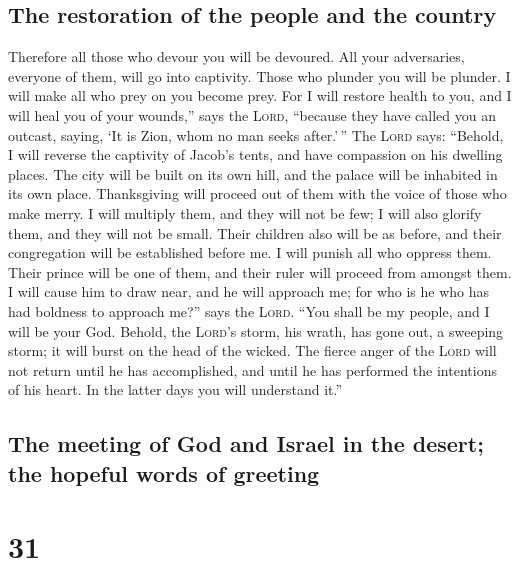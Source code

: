 \hypertarget{the-restoration-of-the-people-and-the-country}{%
\subsection{The restoration of the people and the
country}\label{the-restoration-of-the-people-and-the-country}}

 Therefore all those who devour you will be devoured. All
your adversaries, everyone of them, will go into captivity. Those who
plunder you will be plunder. I will make all who prey on you become
prey.  For I will restore health to you, and I will heal
you of your wounds,'' says the \textsc{Lord}, ``because they have called
you an outcast, saying, `It is Zion, whom no man seeks after.'\,''
 The \textsc{Lord} says: ``Behold, I will reverse the
captivity of Jacob's tents, and have compassion on his dwelling places.
The city will be built on its own hill, and the palace will be inhabited
in its own place.  Thanksgiving will proceed out of them
with the voice of those who make merry. I will multiply them, and they
will not be few; I will also glorify them, and they will not be small.
 Their children also will be as before, and their
congregation will be established before me. I will punish all who
oppress them.  Their prince will be one of them, and
their ruler will proceed from amongst them. I will cause him to draw
near, and he will approach me; for who is he who has had boldness to
approach me?'' says the \textsc{Lord}.  ``You shall be my
people, and I will be your God.  Behold, the
\textsc{Lord}'s storm, his wrath, has gone out, a sweeping storm; it
will burst on the head of the wicked.  The fierce anger
of the \textsc{Lord} will not return until he has accomplished, and
until he has performed the intentions of his heart. In the latter days
you will understand it.''

\hypertarget{the-meeting-of-god-and-israel-in-the-desert-the-hopeful-words-of-greeting}{%
\subsection{The meeting of God and Israel in the desert; the hopeful
words of
greeting}\label{the-meeting-of-god-and-israel-in-the-desert-the-hopeful-words-of-greeting}}

\hypertarget{section-30}{%
\section{31}\label{section-30}}

